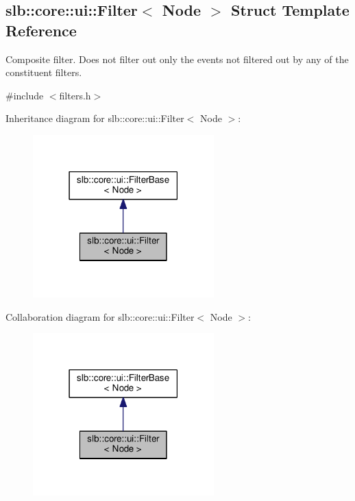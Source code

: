 \hypertarget{structslb_1_1core_1_1ui_1_1Filter}{}\subsection{slb\+:\+:core\+:\+:ui\+:\+:Filter$<$ Node $>$ Struct Template Reference}
\label{structslb_1_1core_1_1ui_1_1Filter}


Composite filter. Does not filter out only the events not filtered out by any of the constituent filters.  




{\ttfamily \#include $<$filters.\+h$>$}



Inheritance diagram for slb\+:\+:core\+:\+:ui\+:\+:Filter$<$ Node $>$\+:\nopagebreak
\begin{figure}[H]
\begin{center}
\leavevmode
\includegraphics[width=198pt]{structslb_1_1core_1_1ui_1_1Filter__inherit__graph}
\end{center}
\end{figure}


Collaboration diagram for slb\+:\+:core\+:\+:ui\+:\+:Filter$<$ Node $>$\+:\nopagebreak
\begin{figure}[H]
\begin{center}
\leavevmode
\includegraphics[width=198pt]{structslb_1_1core_1_1ui_1_1Filter__coll__graph}
\end{center}
\end{figure}
